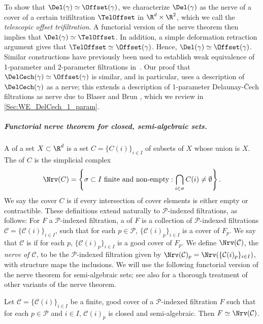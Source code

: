 %
To show that  $\Del(\gamma)\simeq \Offset(\gamma)$, we characterize $\Del(\gamma)$ as the nerve of a cover of a certain trifiltration $\TelOffset$ in $\R^{d}\times\R^{2}$, which we call the \emph{telescopic offset trifiltration}.   A functorial version of the nerve theorem \cite{bauerUnifiedViewFunctorial2023} then implies that $\Del(\gamma)\simeq \TelOffset$.  In addition, a simple deformation retraction argument gives that $\TelOffset\simeq \Offset(\gamma)$.  Hence, $\Del(\gamma)\simeq \Offset(\gamma)$.  Similar constructions have previously been used to establish weak equivalence of 1-parameter and 2-parameter filtrations in~\cite{cavanna2015geometric, corbet2023computing}.  Our proof that $\DelCech(\gamma)\simeq \Offset(\gamma)$ is similar, and in particular, uses a description of $\DelCech(\gamma)$ as a nerve; this extends a description of 1-parameter Delaunay-\v Cech filtrations as nerve due to Blaser and Brun \cite{blaser2022relative}, which we review in \cref{Sec:WE_DelCech_1_param}.
%
\subparagraph{Functorial nerve theorem for closed, semi-algebraic sets.}
A   of a set  $X\subset \R^d$ is a set $C = \{C(i)\}_{i \in I} $ of subsets of $X$ whose union is $X$.
The  of $C$ is the simplicial complex \[ \Nrv(C) = \left\{ \sigma \subset I \textup{ finite and non-empty} :  \bigcap\limits_{i\in \sigma}{ C(i) } \neq \emptyset \right\}.\]
We say the cover $C$ is  if every intersection of cover elements is either empty or contractible. 
%
These definitions extend naturally to $\mathcal{P}$-indexed filtrations, as follows: For $F$ a $\mathcal{P}$-indexed filtration, a  of $F$ is a collection of $\mathcal{P}$-indexed filtrations $\mathcal C = \{\mathcal C{(i)}\}_{i \in I} $, such that for each $p\in \mathcal P$, $\{\mathcal C(i)_p\}_{i\in I}$ is a cover of $F_p$.  We say that $\mathcal C $ is  if for each $p$, $\{\mathcal C(i)_p\}_{i\in I}$ is a good cover of $F_p$. We define $\Nrv(\mathcal C)$, the \emph{nerve of $\mathcal C$}, to be the $\mathcal{P}$-indexed filtration given by 
$\Nrv(\mathcal C)_p=\Nrv(\{\mathcal C(i)_p\}_{i\in I})$, with structure maps the inclusions.
%
We will use the following functorial version of the nerve theorem for semi-algebraic sets; see also  \cite{bauerUnifiedViewFunctorial2023} for a thorough treatment of other variants of the nerve theorem.  
%
\begin{theorem}\label{Thm:Nerve_Semi_algebraic}
Let $\mathcal C=\{\mathcal C(i)\}_{i\in I}$ be a finite, good cover of a $\mathcal{P}$-indexed filtration $F$ such that 
for each $p\in \mathcal {P}$ and $i\in I$, $\mathcal{C}(i)_p$ is closed and semi-algebraic.  Then $F\simeq \Nrv(\mathcal C)$.  
\end{theorem}

